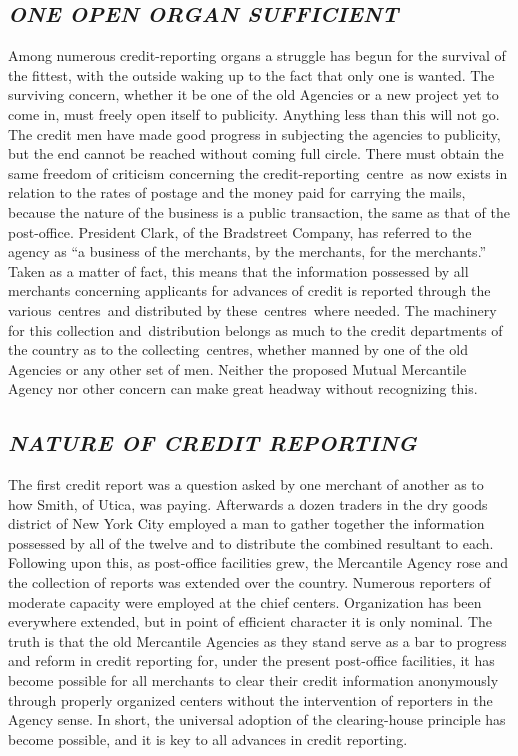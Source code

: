 \documentclass[twoside,symmetric,nobib,justified]{tufte-book}
\begin{document}
\hypertarget{one-open-organ-sufficient}{%
\subsection{\texorpdfstring{\emph{ONE OPEN ORGAN
SUFFICIENT}}{ONE OPEN ORGAN SUFFICIENT}}\label{one-open-organ-sufficient}}

Among numerous credit-reporting organs a struggle has begun for the
survival of the fittest, with the outside waking up to the fact that
only one is wanted. The surviving concern, whether it be one of the old
Agencies or a new project yet to come in, must freely open itself to
publicity. Anything less than this will not go. The credit men have made
good progress in subjecting the agencies to publicity, but the end
cannot be reached without coming full circle. There must obtain the same
freedom of criticism concerning the credit-reporting~centre~as now
exists in relation to the rates of postage and the money paid for
carrying the mails, because the nature of the business is a public
transaction, the same as that of the post-office. President Clark, of
the Bradstreet Company, has referred to the agency as ``a business of
the merchants, by the merchants, for the merchants.'' Taken as a matter
of fact, this means that the information possessed by all merchants
concerning applicants for advances of credit is reported through the
various~centres~and distributed by these~centres~where needed. The
machinery for this collection and~distribution belongs as much to the
credit departments of the country as to the collecting~centres, whether
manned by one of the old Agencies or any other set of men. Neither the
proposed Mutual Mercantile Agency nor other concern can make great
headway without recognizing this.~

\hypertarget{nature-of-credit-reporting}{%
\subsection{\texorpdfstring{\emph{NATURE OF CREDIT
REPORTING}}{NATURE OF CREDIT REPORTING}}\label{nature-of-credit-reporting}}

The first credit report was a question asked by one merchant of another
as to how Smith, of Utica, was paying. Afterwards a dozen traders in the
dry goods district of New York City employed a man to gather together
the information possessed by all of the twelve and to distribute the
combined resultant to each. Following upon this, as post-office
facilities grew, the Mercantile Agency rose and the collection of
reports was extended over the country. Numerous reporters of moderate
capacity were employed at the chief centers. Organization has been
everywhere extended, but in point of efficient character it is only
nominal. The truth is that the old Mercantile Agencies as they stand
serve as a bar to progress and reform in credit reporting for, under the
present post-office facilities, it has become possible for all merchants
to clear their credit information anonymously through properly organized
centers without the intervention of reporters in the Agency sense. In
short, the universal adoption of the clearing-house principle has become
possible, and it is key to all advances in credit reporting.~
\end{document}
